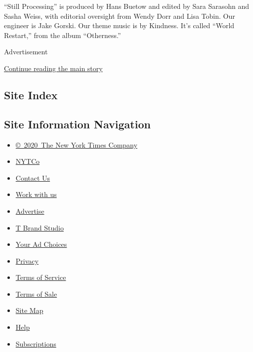 ``Still Processing'' is produced by Hans Buetow and edited by Sara
Sarasohn and Sasha Weiss, with editorial oversight from Wendy Dorr and
Lisa Tobin. Our engineer is Jake Gorski. Our theme music is by Kindness.
It's called ``World Restart,'' from the album ``Otherness.''

Advertisement

\protect\hyperlink{after-bottom}{Continue reading the main story}

\hypertarget{site-index}{%
\subsection{Site Index}\label{site-index}}

\hypertarget{site-information-navigation}{%
\subsection{Site Information
Navigation}\label{site-information-navigation}}

\begin{itemize}
\tightlist
\item
  \href{https://help.nytimes.com/hc/en-us/articles/115014792127-Copyright-notice}{©~2020~The
  New York Times Company}
\end{itemize}

\begin{itemize}
\tightlist
\item
  \href{https://www.nytco.com/}{NYTCo}
\item
  \href{https://help.nytimes.com/hc/en-us/articles/115015385887-Contact-Us}{Contact
  Us}
\item
  \href{https://www.nytco.com/careers/}{Work with us}
\item
  \href{https://nytmediakit.com/}{Advertise}
\item
  \href{http://www.tbrandstudio.com/}{T Brand Studio}
\item
  \href{https://www.nytimes.com/privacy/cookie-policy\#how-do-i-manage-trackers}{Your
  Ad Choices}
\item
  \href{https://www.nytimes.com/privacy}{Privacy}
\item
  \href{https://help.nytimes.com/hc/en-us/articles/115014893428-Terms-of-service}{Terms
  of Service}
\item
  \href{https://help.nytimes.com/hc/en-us/articles/115014893968-Terms-of-sale}{Terms
  of Sale}
\item
  \href{https://spiderbites.nytimes.com}{Site Map}
\item
  \href{https://help.nytimes.com/hc/en-us}{Help}
\item
  \href{https://www.nytimes.com/subscription?campaignId=37WXW}{Subscriptions}
\end{itemize}
